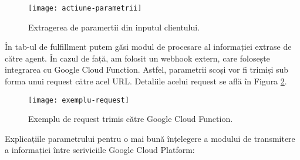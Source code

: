 \begin{figure}[h]
    \centering
    \texttt{[image: actiune-parametrii]}
    \caption{Extragerea de paramertii din inputul clientului.}
    \label{fig:actiune-parametrii}
\end{figure}

În tab-ul de fulfillment putem găsi modul de procesare al informației extrase de către agent. În cazul de față, am folosit un webhook extern, care folosește integrarea cu Google Cloud Function. Astfel, parametrii scoși vor fi trimiși sub forma unui request către acel URL. Detaliile acelui request se află în Figura \ref{fig:exemplu-request}.

\begin{figure}[h]
    \centering
    \texttt{[image: exemplu-request]}
    \caption{Exemplu de request trimis către Google Cloud Function.}
    \label{fig:exemplu-request}
\end{figure}

Explicațiile parametrului pentru o mai bună înțelegere a modului de transmitere a informației între seriviciile Google Cloud Platform:

